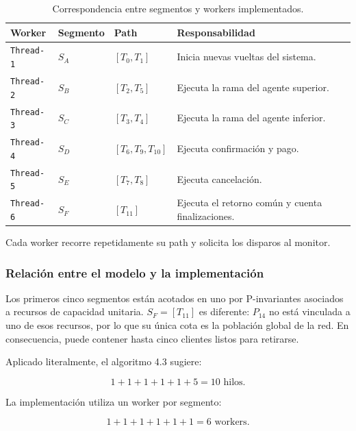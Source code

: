 \documentclass[11pt,a4paper]{article}
\begin{document}
\begin{table}[H]
    \centering
    \caption{Correspondencia entre segmentos y workers implementados.}
    \label{tab:workers-responsabilidades}
    \small
    \begin{tabularx}{\textwidth}{@{} l l l X @{}}
        \toprule
        \textbf{Worker} & \textbf{Segmento} & \textbf{Path} & \textbf{Responsabilidad} \\ \midrule
        \texttt{Thread-1} & $S_A$ & $[T_0,T_1]$ &
        Inicia nuevas vueltas del sistema. \\
        \texttt{Thread-2} & $S_B$ & $[T_2,T_5]$ &
        Ejecuta la rama del agente superior. \\
        \texttt{Thread-3} & $S_C$ & $[T_3,T_4]$ &
        Ejecuta la rama del agente inferior. \\
        \texttt{Thread-4} & $S_D$ & $[T_6,T_9,T_{10}]$ &
        Ejecuta confirmación y pago. \\
        \texttt{Thread-5} & $S_E$ & $[T_7,T_8]$ &
        Ejecuta cancelación. \\
        \texttt{Thread-6} & $S_F$ & $[T_{11}]$ &
        Ejecuta el retorno común y cuenta finalizaciones. \\
        \bottomrule
    \end{tabularx}
\end{table}

Cada worker recorre repetidamente su path y solicita los disparos al monitor.

\subsubsection{Relación entre el modelo y la implementación}

Los primeros cinco segmentos están acotados en uno por P-invariantes asociados
a recursos de capacidad unitaria. $S_F=[T_{11}]$ es diferente: $P_{14}$ no
está vinculada a uno de esos recursos, por lo que su única cota es la población
global de la red. En consecuencia, puede contener hasta cinco clientes listos
para retirarse.

Aplicado literalmente, el algoritmo 4.3 sugiere:

\begin{equation}
    1+1+1+1+1+5=10\text{ hilos}.
\end{equation}

La implementación utiliza un worker por segmento:

\begin{equation}
    1+1+1+1+1+1=6\text{ workers}.
\end{equation}
\end{document}

